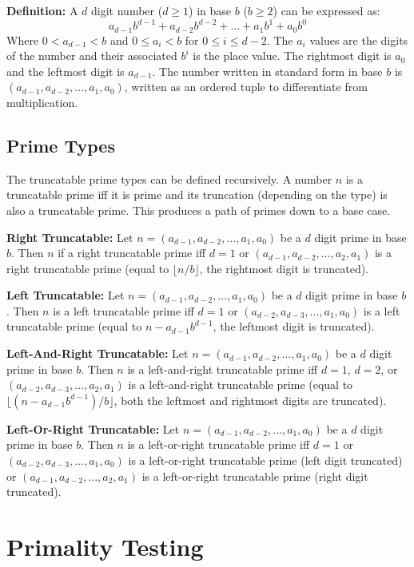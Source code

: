 \documentclass[12pt]{article}
\begin{document}
\textbf{Definition:} A $d$ digit number ($d\geq1$) in base $b$ ($b\geq2$) can be expressed as:
$$ a_{d-1}b^{d-1} + a_{d-2}b^{d-2} + \ldots + a_1b^1 + a_0b^0 $$
Where $0<a_{d-1}<b$ and $0\leq a_i<b$ for $0\leq i\leq d-2$. The $a_i$ values are the digits of the number and their associated $b^i$ is the place value. The rightmost digit is $a_0$ and the leftmost digit is $a_{d-1}$. The number written in standard form in base $b$ is $(a_{d-1},a_{d-2},\ldots,a_1,a_0)$, written as an ordered tuple to differentiate from multiplication.

\subsection{Prime Types}

The truncatable prime types can be defined recursively. A number $n$ is a truncatable prime iff it is prime and its truncation (depending on the type) is also a truncatable prime. This produces a path of primes down to a base case.

\textbf{Right Truncatable:} Let $n=(a_{d-1},a_{d-2},\ldots,a_1,a_0)$ be a $d$ digit prime in base $b$. Then $n$ if a right truncatable prime iff $d=1$ or $(a_{d-1},a_{d-2},\ldots,a_2,a_1)$ is a right truncatable prime (equal to $\lfloor n/b\rfloor$, the rightmost digit is truncated).

\textbf{Left Truncatable:} Let $n=(a_{d-1},a_{d-2},\ldots,a_1,a_0)$ be a $d$ digit prime in base $b$. Then $n$ is a left truncatable prime iff $d=1$ or $(a_{d-2},a_{d-3},\ldots,a_1,a_0)$ is a left truncatable prime (equal to $n-a_{d-1}b^{d-1}$, the leftmost digit is truncated).

\textbf{Left-And-Right Truncatable:} Let $n=(a_{d-1},a_{d-2},\ldots,a_1,a_0)$ be a $d$ digit prime in base $b$. Then $n$ is a left-and-right truncatable prime iff $d=1$, $d=2$, or $(a_{d-2},a_{d-3},\ldots,a_2,a_1)$ is a left-and-right truncatable prime (equal to $\lfloor(n-a_{d-1}b^{d-1})/b\rfloor$, both the leftmost and rightmost digits are truncated).

\textbf{Left-Or-Right Truncatable:} Let $n=(a_{d-1},a_{d-2},\ldots,a_1,a_0)$ be a $d$ digit prime in base $b$. Then $n$ is a left-or-right truncatable prime iff $d=1$ or $(a_{d-2},a_{d-3},\ldots,a_1,a_0)$ is a left-or-right truncatable prime (left digit truncated) or $(a_{d-1},a_{d-2},\ldots,a_2,a_1)$ is a left-or-right truncatable prime (right digit truncated).

\section{Primality Testing}
\end{document}

